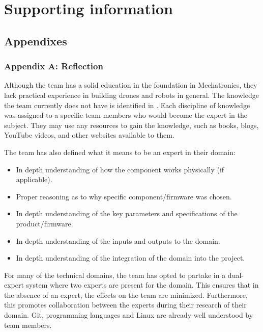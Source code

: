 \documentclass{article}
\begin{document}
\section{Supporting information}
\subsection{Appendixes}
\label{appendix}
\subsubsection{Appendix A: Reflection}
\label{appendixa}
Although the team has a solid education in the foundation in Mechatronics, they lack practical experience in building drones and robots in general. The knowledge the team currently does not have is identified in . Each discipline of knowledge was assigned to a specific team members who would become the expert in the subject. They may use any resources to gain the knowledge, such as books, blogs, YouTube videos, and other websites available to them. 

The team has also defined what it means to be an expert in their domain: 
\begin{itemize}
    \item In depth understanding of how the component works physically (if applicable). 
    \item Proper reasoning as to why specific component/firmware was chosen.
    \item In depth understanding of the key parameters and specifications of the product/firmware.
    \item In depth understanding of the inputs and outputs to the domain. 
    \item In depth understanding of the integration of the domain into the project. 
\end{itemize}

For many of the technical domains, the team has opted to partake in a dual-expert system where two experts are present for the domain. This ensures that in the absence of an expert, the effects on the team are minimized. Furthermore, this promotes collaboration between the experts during their research of their domain. Git, programming languages and Linux are already well understood by team members. 
\end{document}
